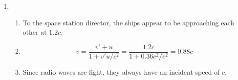 \documentclass[fleqn]{article}[12pt]
\begin{document}
\begin{enumerate}
    \item \begin{enumerate}
        \item To the space station director, the ships appear to be approaching each other at $1.2c$.
        \item
        \begin{equation*}
            v = \frac{v'+u}{1+v'u/c^2} = \frac{1.2c}{1+0.36c^2/c^2} = 0.88c
        \end{equation*}
        \item Since radio waves are light, they always have an incident speed of $c$.
    \end{enumerate}
\end{enumerate}
\end{document}
